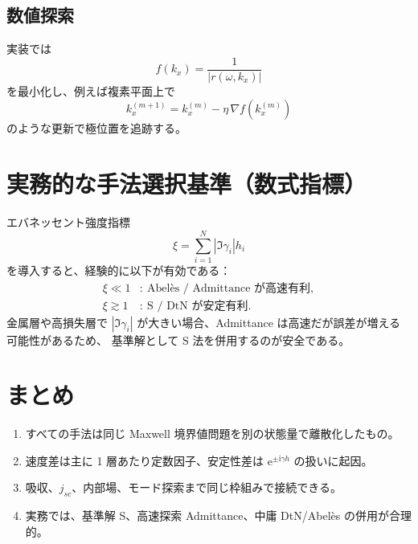 \documentclass[a4paper,11pt]{article}
\newcommand{\ii}{\mathrm{i}}
\newcommand{\ee}{\mathrm{e}}
\begin{document}
\subsection{数値探索}
実装では
\begin{equation}
f(k_x)=\frac{1}{|r(\omega,k_x)|}
\end{equation}
を最小化し、例えば複素平面上で
\begin{equation}
k_x^{(m+1)}=k_x^{(m)}-\eta\,\nabla f\!\left(k_x^{(m)}\right)
\end{equation}
のような更新で極位置を追跡する。

\section{実務的な手法選択基準（数式指標）}

エバネッセント強度指標
\begin{equation}
\xi=\sum_{i=1}^{N}|\Im\gamma_i|h_i
\end{equation}
を導入すると、経験的に以下が有効である：
\begin{align}
\xi\ll 1 &:\ \text{Abel\`es / Admittance が高速有利},\\
\xi\gtrsim 1 &:\ \text{S / DtN が安定有利}.
\end{align}
金属層や高損失層で $|\Im\gamma_i|$ が大きい場合、Admittance は高速だが誤差が増える可能性があるため、
基準解として S 法を併用するのが安全である。

\section*{まとめ}
\begin{enumerate}[label=\arabic*)]
\item すべての手法は同じ Maxwell 境界値問題を別の状態量で離散化したもの。
\item 速度差は主に 1 層あたり定数因子、安定性差は $\ee^{\pm\ii\gamma h}$ の扱いに起因。
\item 吸収、$j_{sc}$、内部場、モード探索まで同じ枠組みで接続できる。
\item 実務では、基準解 S、高速探索 Admittance、中庸 DtN/Abel\`es の併用が合理的。
\end{enumerate}
\end{document}
